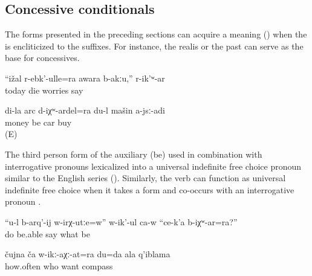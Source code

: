 
\subsection{Concessive conditionals}
\label{sec:concessiveconditionals}

The  forms presented in the preceding sections can acquire a   meaning () when the  is encliticized to the  suffixes. For instance, the realis   or the past   can serve as the base for concessives.
%
\begin{exe}
	\ex	\label{ex:‎‎‎Even if I die today, I am not worried, she said}
	\gll	``ižal	r-ebk'-ulle=ra	awara	b-akːu,''	r-ik'ʷ-ar\\
		today	die	worries		say\\
	\glt	{}

	\ex	\label{ex:‎‎Even if I had money, I would not buy a car}
	\gll	di-la	arc	d-iχʷ-ardel=ra		du-l	mašin	a-jsː-adi\\
			money	be		car	buy\\
	\glt	{} (E)
\end{exe}

The third person   form of the auxiliary  (be) used in combination with interrogative pronouns lexicalized into a universal indefinite free choice pronoun similar to the English  series  (). Similarly, the verb   can function as universal indefinite free choice when it takes a   form and co-occurs with an interrogative pronoun .
%
\begin{exe}
	\ex	\label{ex:Are you able to do whatever? he says}
	\gll	``u-l	b-arq'-ij	w-irχ-utːe=w''	w-ik'-ul	ca-w	``ce-k'a	b-iχʷ-ar=ra?''\\
			do	be.able	say		what		be\\
	\glt	{}

	\ex	\label{ex:How often whoever you love, I am your compass}
	\gll	čujna	ča	w-ikː-aχː-at=ra		du=da	ala	q'iblama\\
		how.often	who	want			compass\\
	\glt	{}
\end{exe}

